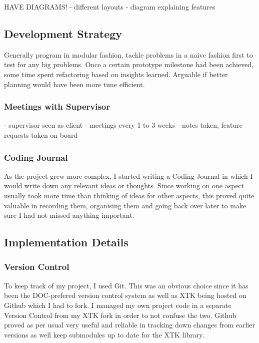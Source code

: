 \documentclass[a4paper,11pt,titlepage]{article}
\begin{document}
HAVE DIAGRAMS!
	- different layouts
	- diagram explaining features



\subsection{Development Strategy}

Generally program in modular fashion, tackle problems in a naive fashion first to test for any big problems. Once a certain prototype milestone had been achieved, some time spent refactoring based on insights learned. Arguable if  better planning would have been more time efficient.

\subsubsection{Meetings with Supervisor}

- supervisor seen as client
- meetings every 1 to 3 weeks
- notes taken, feature requests taken on board

\subsubsection{Coding Journal}

As the project grew more complex, I started writing a Coding Journal in which I would write down any relevant ideas or thoughts. Since working on one aspect usually took more time than thinking of ideas for other aspects, this proved quite valuable in recording them, organising them and going back over later to make sure I had not missed anything important.


\subsection{Implementation Details}

\subsubsection{Version Control}

To keep track of my project, I used Git. This was an obvious choice since it has been the DOC-prefered version control system as well as XTK being hosted on Github which I had to fork. I managed my own project code in a separate Version Control from my XTK fork in order to not confuse the two. Github proved as per usual very useful and reliable in tracking down changes from earlier versions as well keep submodules up to date for the XTK library.
\end{document}
